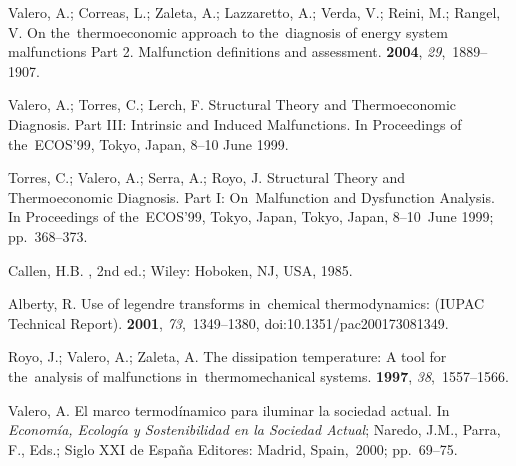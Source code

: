 \documentclass[energies,article,accept,moreauthors,pdftex]{Definitions/mdpi}
\begin{document}
\begin{thebibliography}{999}
	
	Valero, A.; Correas, L.; Zaleta, A.; Lazzaretto, A.; Verda, V.; Reini, M.;
	Rangel, V.
	\newblock On the~thermoeconomic approach to the~diagnosis of energy system
	malfunctions Part 2. Malfunction definitions and assessment.
	 {\bf 2004}, {\em 29},~1889--1907.

	
	Valero, A.; Torres, C.; Lerch, F.
	\newblock Structural Theory and Thermoeconomic Diagnosis. Part III: Intrinsic
	and Induced Malfunctions.
	\newblock In Proceedings of the~ECOS'99, Tokyo, Japan, 8--10 June 1999.

	
	Torres, C.; Valero, A.; Serra, A.; Royo, J.
	\newblock Structural Theory and Thermoeconomic Diagnosis. Part I: On~Malfunction and Dysfunction Analysis.
	\newblock In Proceedings of the~ECOS'99, Tokyo, Japan, Tokyo, Japan, 8--10~June 1999; pp.~368--373.

	
	Callen, H.B.
	,
	2nd ed.; Wiley: Hoboken, NJ, USA, 1985.

	
	Alberty, R.
	\newblock Use of legendre transforms in~chemical thermodynamics: (IUPAC
	Technical Report).
	 {\bf 2001}, {\em 73},~1349--1380, doi:10.1351/pac200173081349.

	
	Royo, J.; Valero, A.; Zaleta, A.
	\newblock The dissipation temperature: A tool for the~analysis of malfunctions
	in~thermomechanical systems.
	 {\bf 1997}, {\em
		38},~1557--1566.

	
	Valero, A.
	\newblock El marco termodínamico para iluminar la sociedad actual. In~{\em
		Economía, Ecología y Sostenibilidad en la Sociedad Actual}; Naredo, J.M.,
	Parra, F., Eds.; Siglo XXI de España Editores: Madrid, Spain,~2000; pp.~69--75.
	
	
\end{thebibliography}
\end{document}
